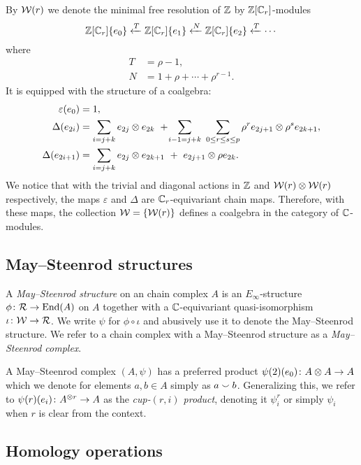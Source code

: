By $\mathcal{W}(r)$ we denote the minimal free resolution of $\mathbb{Z}$ by $\mathbb{Z}[\mathbb{C}_r]$-modules
\begin{equation}\label{eq: minimal resolution}
	\mathbb{Z}[\mathbb{C}_r]\{e_0\} \xleftarrow{T} \mathbb{Z}[\mathbb{C}_r]\{e_1\} \xleftarrow{N} \mathbb{Z}[\mathbb{C}_r]\{e_2\} \xleftarrow{T} \cdots
\end{equation}
where
\begin{equation} \label{eq: T and R definition}
	\begin{split}
		T &= \rho - 1, \\
		N &= 1 + \rho + \cdots + \rho^{r-1}.
	\end{split}
\end{equation}
It is equipped with the structure of a coalgebra:
\begin{align*}
	\varepsilon(e_0) &= 1, \\
	\Delta(e_{2i}) &=
	\sum_{i=j+k} e_{2j} \otimes e_{2k} \ + \! \sum_{i-1=j+k} \ \sum_{0 \leq r \leq s \leq p} \rho^r e_{2j+1} \otimes \rho^s e_{2k+1}, \\
	\Delta(e_{2i+1}) &=
	\sum_{i=j+k} e_{2j} \otimes e_{2k+1} \ +\ e_{2j+1} \otimes \rho e_{2k}.
\end{align*}
We notice that with the trivial and diagonal actions in $\mathbb{Z}$ and $\mathcal{W}(r) \otimes \mathcal{W}(r)$ respectively, the maps $\varepsilon$ and $\Delta$ are $\mathbb{C}_r$-equivariant chain maps.
Therefore, with these maps, the collection $\mathcal{W} = \{\mathcal{W}(r)\}$ defines a coalgebra in the category of $\mathbb{C}$-modules.

\subsection{May--Steenrod structures}

A \textit{May--Steenrod structure} on an chain complex $A$ is an $E_\infty$-structure $\phi \colon \mathcal{R} \to \mathrm{End}(A)$ on $A$ together with a $\mathbb{C}$-equivariant quasi-isomorphism $\iota \colon \mathcal{W} \to \mathcal{R}$.
We write $\psi$ for $\phi \circ \iota$ and abusively use it to denote the May--Steenrod structure.
We refer to a chain complex with a May--Steenrod structure as a \textit{May--Steenrod complex}.

A May--Steenrod complex $(A,\psi)$ has a preferred product $\psi(2)(e_0) \colon A \otimes A \to A$ which we denote for elements $a, b \in A$ simply as $a \smallsmile b$.
Generalizing this, we refer to $\psi(r)(e_i) \colon A^{\otimes r} \to A$ as the \textit{cup-$(r,i)$ product}, denoting it $\psi_i^r$ or simply $\psi_i$ when $r$ is clear from the context.

\subsection{Homology operations}

